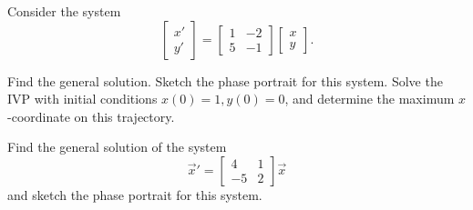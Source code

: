 \documentclass{ximera}
\begin{document}
\begin{exercise}
    Consider the system
    \begin{equation*}
        \begin{bmatrix} 
            x' \\ 
            y' 
        \end{bmatrix} 
        = 
        \begin{bmatrix} 
            1& -2 \\ 
            5 & -1 
        \end{bmatrix} 
        \begin{bmatrix} 
            x \\ 
            y 
        \end{bmatrix}.
    \end{equation*} %
    \begin{tasks}
        \task Find the general solution.
        \task Sketch the phase portrait for this system.
        \task Solve the IVP with initial conditions $x(0)=1, y(0)=0$, and determine the maximum $x$-coordinate on this trajectory.
    \end{tasks}
\end{exercise}

\begin{exercise}%
    Find the general solution of the system
    \begin{equation*}
        {\vec{x}}' = 
        \begin{bmatrix} 
            4 & 1 \\ 
            -5 & 2 
        \end{bmatrix} \vec{x}
    \end{equation*}
    and sketch the phase portrait for this system.
\end{exercise}
\end{document}
